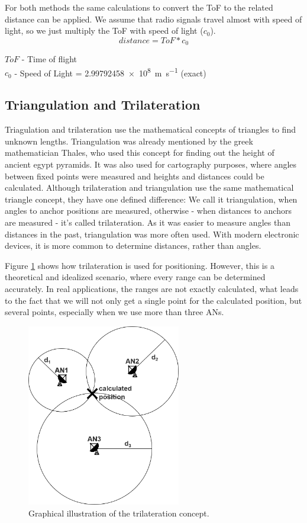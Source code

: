 For both methods the same calculations to convert the ToF to the related distance can be applied. We assume that radio signals travel almost with speed of light, so we just multiply the ToF with speed of light ($c_{0}$).
$$ distance = ToF * c_{0} $$

$ToF$ - Time of flight\\
$c_{0}$ - Speed of Light = \SI{2.99792458e8}{\meter\per\second} (exact) \\

\subsection{Triangulation and Trilateration}
Triagulation and trilateration use the mathematical concepts of triangles to find unknown lengths. Triangulation was already mentioned by the greek mathematician Thales, who used this concept for finding out the height of ancient egypt pyramids. \cite{thales} It was also used for cartography purposes, where angles between fixed points were measured and heights and distances could be calculated. 
Although trilateration and triangulation use the same mathematical triangle concept, they have one defined difference: We call it triangulation, when angles to anchor positions are measured, otherwise - when distances to anchors are measured - it's called trilateration.
As it was easier to measure angles than distances in the past, triangulation was more often used. With modern electronic devices, it is more common to determine distances, rather than angles. 

Figure \ref{fig:trilateration} shows how trilateration is used for positioning. However, this is a theoretical and idealized scenario, where every range can be determined accurately. In real applications, the ranges are not exactly calculated, what leads to the fact that we will not only get a single point for the calculated position, but several points, especially when we use more than three ANs.

\begin{figure}[th]
\centering
\includegraphics[width=0.6\textwidth]{Figures/trilateration}
\decoRule
\caption[Trilateration]{Graphical illustration of the trilateration concept.}
\label{fig:trilateration}
\end{figure}

